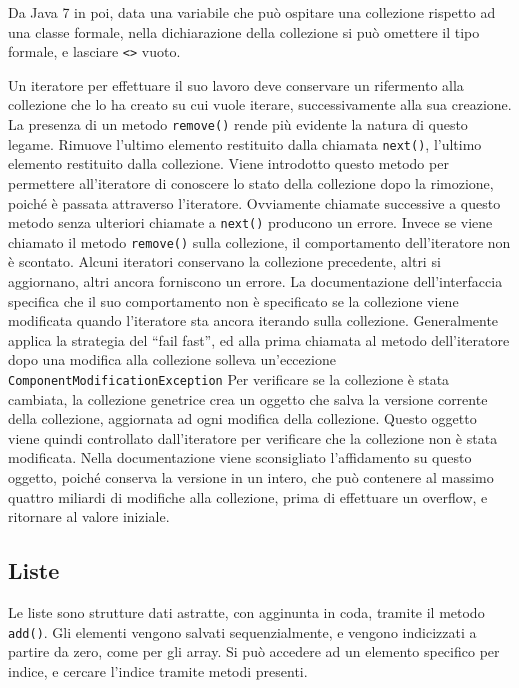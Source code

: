 \documentclass{article}
\numberwithin{equation}{subsection}
\begin{document}

Da Java 7 in poi, data una variabile che può ospitare una collezione rispetto ad una classe formale, nella dichiarazione della collezione si può omettere il tipo formale, e 
lasciare \verb|<>| vuoto. 



Un iteratore per effettuare il suo lavoro deve conservare un rifermento alla collezione che lo ha creato su cui vuole iterare, successivamente alla sua creazione. 
La presenza di un metodo \verb|remove()| rende più evidente la natura di questo legame. Rimuove l'ultimo elemento restituito dalla chiamata \verb|next()|, l'ultimo 
elemento restituito dalla collezione. Viene introdotto questo metodo per permettere all'iteratore di conoscere lo stato della collezione dopo la rimozione, poiché è 
passata attraverso l'iteratore. 
Ovviamente chiamate successive a questo metodo senza ulteriori chiamate a \verb|next()| producono un errore. Invece se viene chiamato il metodo \verb|remove()| sulla 
collezione, il comportamento dell'iteratore non è scontato. 
Alcuni iteratori conservano la collezione precedente, altri si aggiornano, altri ancora forniscono un errore. 
La documentazione dell'interfaccia specifica che il suo comportamento non è specificato se la collezione viene modificata quando l'iteratore sta ancora iterando sulla collezione. 
Generalmente applica la strategia del ``fail fast'', ed alla prima chiamata al metodo dell'iteratore dopo una modifica alla collezione solleva un'eccezione \verb|ComponentModificationException|
Per verificare se la collezione è stata cambiata, la collezione genetrice crea un oggetto che salva la versione corrente della collezione, aggiornata ad ogni modifica 
della collezione. Questo oggetto viene quindi controllato dall'iteratore per verificare che la collezione non è stata modificata. 
Nella documentazione viene sconsigliato l'affidamento su questo oggetto, poiché conserva la versione in un intero, che può contenere al massimo quattro miliardi di modifiche 
alla collezione, prima di effettuare un overflow, e ritornare al valore iniziale. 

\subsection{Liste}

Le liste sono strutture dati astratte, con agginunta in coda, tramite il metodo \verb|add()|. Gli elementi vengono salvati sequenzialmente, e vengono indicizzati a partire
da zero, come per gli array. Si può accedere ad un elemento specifico per indice, e cercare l'indice tramite metodi presenti. 
\end{document}
